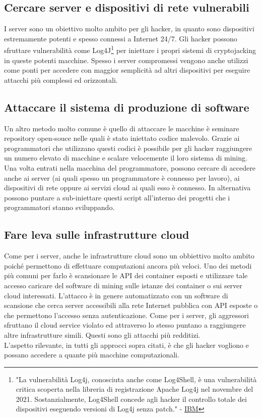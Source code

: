 \documentclass[12pt,a4paper]{article}
\begin{document}
\subsection{Cercare server e dispositivi di rete vulnerabili}
I server sono un obiettivo molto ambito per gli hacker, in quanto sono
dispositivi estremamente potenti e spesso connessi a Internet 24/7. Gli hacker
possono sfruttare vulnerabilità come Log4J\footnote{"La vulnerabilità Log4j,
conosciuta anche come Log4Shell, è una vulnerabilità critica scoperta nella
libreria di registrazione Apache Log4j nel novembre del 2021. Sostanzialmente,
Log4Shell concede agli hacker il controllo totale dei dispositivi eseguendo
versioni di Log4j senza patch." - \href{https://arc.net/l/quote/zjujxamu}{IBM}}
per iniettare i propri sistemi di cryptojacking in queste potenti macchine.
Spesso i server compromessi vengono anche utilizzi come ponti per accedere con
maggior semplicità ad altri dispositivi per eseguire attacchi più complessi ed
orizzontali.

\subsection{Attaccare il sistema di produzione di software}
Un altro metodo molto comune è quello di attaccare le macchine è seminare
repository open-souce nelle quali è stato iniettato codice malevolo. Grazie ai
programmatori che utilizzano questi codici è possibile per gli hacker
raggiungere un numero elevato di macchine e scalare velocemente il loro sistema
di mining. Una volta entrati nella macchina del programmatore, possono cercare
di accedere anche ai server (ai quali spesso un programmatore è connesso per
lavoro), ai dispositivi di rete oppure ai servizi cloud ai quali esso è
connesso. In alternativa possono puntare a sub-iniettare questi script
all'interno dei progetti che i programmatori stanno sviluppando.

\subsection{Fare leva sulle infrastrutture cloud}
Come per i server, anche le infrastrutture cloud sono un obbiettivo molto ambito
poiché permettono di effettuare computazioni ancora più veloci. Uno dei metodi
più comuni per farlo è scansionare le API dei container esposti e utilizzare
tale accesso caricare del software di mining sulle istanze dei
container o sui server cloud interessati. L'attacco è in genere automatizzato
con un software di scansione che cerca server accessibili alla rete Internet
pubblica con API esposte o che permettono l'accesso senza autenticazione. Come
per i server, gli aggressori sfruttano il cloud service violato ed attraverso lo
stesso puntano a raggiungere altre infrastrutture simili. Questi sono gli
attacchi più redditizi. \\
L'aspetto rilevante, in tutti gli approcci sopra citati, è che gli hacker
vogliono e possano accedere a quante più macchine computazionali.
\end{document}
